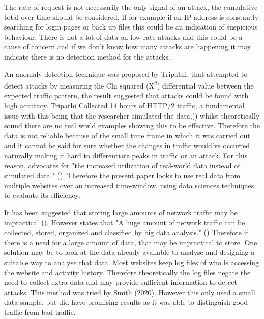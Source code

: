The rate of request is not necessarily the only signal of an attack, the cumulative total over time should be considered. If for example if an IP address is constantly searching for login pages or back up files this could be an indication of suspicious behaviour. There is not a lot of data on low rate attacks and this could be a cause of concern and if we don't know how many attacks are happening it may indicate there is no detection method for the attacks. 

 
An anomaly detection technique was proposed by  Tripathi, that attempted to detect attacks by measuring the Chi squared (X\textsuperscript{\small2}) differential value between the expected traffic pattern, the result suggested that attacks could be found with high accuracy. Tripathi Collected 14 hours of HTTP/2 traffic, a fundamental issue with this being that the researcher simulated the data,(\cite{tripathi2018slow}) whilst theoretically sound there are no real world examples showing this to be effective. Therefore the data is not reliable because of the small time frame in which it was carried out and  it cannot be said for sure whether the changes in traffic would've occurred naturally making it hard to differentiate peaks in traffic or an attack. For this reason, \citeauthor{8500383} advocates for "the increased utilization of real-world data instead of simulated data." (\cite{8500383}). Therefore the present paper looks to use real data from multiple websites over an increased time-window, using data sciences techniques, to evaluate its efficiency. 

It has been suggested that storing large amounts of network traffic may be impractical (\cite{staniford2002practical}). However \citeauthor{9016229} states that  "A huge amount of network traffic can be collected, stored, organized and classified by big data analysis." (\cite{9016229}) Therefore if there is a need for a large amount of data, that may be impractical to store. One solution may be to look at the data already available to analyse and designing a suitable way to analyse that data. Most websites keep log files of who is accessing the website and activity history. Therefore theoretically the log files negate the need to collect extra data and may provide sufficient information to detect attacks. This method was tried by Smith (2020). However this only used a small data sample, but did have promising results as it was able to distinguish good traffic from bad traffic. 

